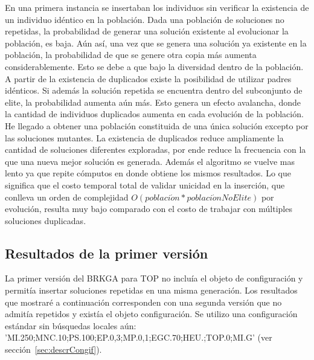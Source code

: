 \bigskip

En una primera instancia se insertaban los individuos sin verificar la existencia de un individuo idéntico en la población. Dada una población de soluciones no repetidas, la probabilidad de generar una solución existente al evolucionar la población, es baja. Aún así, una vez que se genera una solución ya existente en la población, la probabilidad de que se genere otra copia más aumenta considerablemente. Esto se debe a que bajo la diversidad dentro de la población. A partir de la existencia de duplicados existe la posibilidad de utilizar padres idénticos. Si además la solución repetida se encuentra dentro del subconjunto de elite, la probabilidad aumenta aún más. Esto genera un efecto avalancha, donde la cantidad de individuos duplicados aumenta en cada evolución de la población. He llegado a obtener una población constituida de una única solución excepto por las soluciones mutantes. La existencia de duplicados reduce ampliamente la cantidad de soluciones diferentes exploradas, por ende reduce la frecuencia con la que una nueva mejor solución es generada. Además el algoritmo se vuelve mas lento ya que repite cómputos en donde obtiene los mismos resultados. Lo que significa que el costo temporal total de validar unicidad en la inserción, que conlleva un orden de complejidad $O(poblaci\acute{o}n * poblaci\acute{o}nNoElite)$ por evolución, resulta muy bajo comparado con el costo de trabajar con múltiples soluciones duplicadas.

\subsection{Resultados de la primer versión}

La primer versión del BRKGA para TOP no incluía el objeto de configuración y permitía insertar soluciones repetidas en una misma generación. Los resultados que mostraré a continuación corresponden con una segunda versión que no admitía repetidos y existía el objeto configuración. Se utilizo una configuración estándar sin búsquedas locales aún: 
\\ 'MI.250;MNC.10;PS.100;EP.0,3;MP.0,1;EGC.70;HEU.;TOP.0;MI.G' (ver sección~\ref{sec:descrCongif}).

\bigskip

